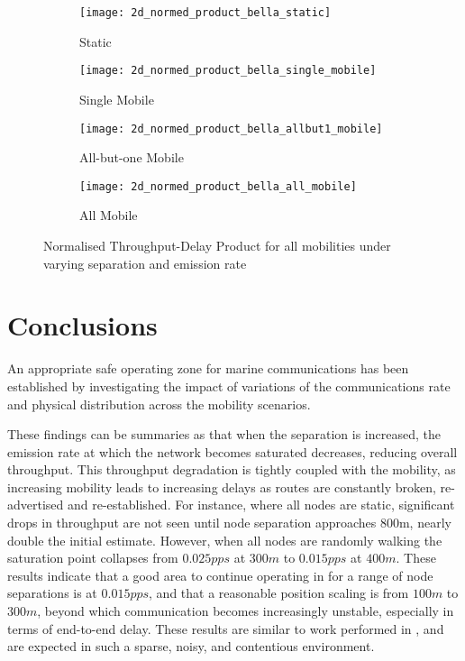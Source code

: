 

\begin{figure}[h]
  \begin{subfigure}[t]{0.5\textwidth}
    \centering
    \texttt{[image: 2d\_normed\_product\_bella\_static]}
    \caption{Static}
    \label{fig:2d_normed_product_bella_static}
  \end{subfigure}
  \begin{subfigure}[t]{0.5\textwidth}
    \centering
    \texttt{[image: 2d\_normed\_product\_bella\_single\_mobile]}
    \caption{Single Mobile}
    \label{fig:2d_normed_product_bella_single_mobile}
  \end{subfigure}
  
  \begin{subfigure}[t]{0.5\textwidth}
    \centering
    \texttt{[image: 2d\_normed\_product\_bella\_allbut1\_mobile]}
    \caption{All-but-one Mobile}
    \label{fig:2d_normed_product_bella_allbut1_mobile}
  \end{subfigure}
  \begin{subfigure}[t]{0.5\textwidth}
    \centering
    \texttt{[image: 2d\_normed\_product\_bella\_all\_mobile]}
    \caption{All Mobile}
    \label{fig:2d_normed_product_bella_all_mobile}
  \end{subfigure}
  \caption{Normalised Throughput-Delay Product for all mobilities under varying separation and emission rate}
  \label{fig:2d_normed_product}
\end{figure}


\section{Conclusions}

An appropriate safe operating zone for marine communications has been established by investigating the impact of variations of the communications rate and physical distribution across the mobility scenarios.

These findings can be summaries as that when the separation is increased, the emission rate at which the network becomes saturated decreases, reducing overall throughput. 
This throughput degradation is tightly coupled with the mobility, as increasing mobility leads to increasing delays as routes are constantly broken, re-advertised and re-established. 
For instance, where all nodes are static, significant drops in throughput are not seen until node separation approaches 800m, nearly double the initial estimate. 
However, when all nodes are randomly walking the saturation point collapses from $0.025pps$ at $300m$ to $0.015pps$ at $400m$.
These results indicate that a good area to continue operating in for a range of node separations is at $0.015pps$, and that a reasonable position scaling is from $100m$ to $300m$, beyond which communication becomes increasingly unstable, especially in terms of end-to-end delay.
These results are similar to work performed in \cite{Miquel2008}, and are expected in such a sparse, noisy, and contentious environment. 



